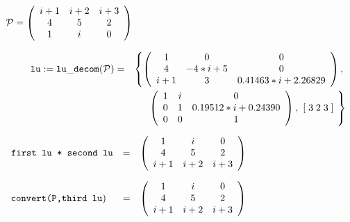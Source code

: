\vspace*{0.5in}

\begin{flushleft}
\hspace*{0.175in}
\begin{math}  
{\cal P} = \left( \begin{array}{ccc} i+1 & i+2 & i+3 \\ 4 & 5 & 2 \\ 1 
& i & 0
\end{array} \right)
\end{math}  
\end{flushleft}

\begin{eqnarray}
\hspace*{0.22in}
{\tt lu} := {\tt lu\_decom}({\cal P}) & = & 
\left\{ 
        \left( \begin{array}{ccc} 1 & 0 & 0 \\ 4 & -4*i+5 & 0 \\ i+1 & 
3 & 0.41463*i+2.26829 \end{array} \right), \right. \nonumber \\ & & 
\left. \: \; \,  \left( \begin{array}{ccc} 1 & i & 0 \\ 0 & 1 & 
0.19512*i+0.24390 \\ 0 & 0 & 1 \end{array} \right), \hspace*{0.05in} 
[\; 3 \; 2 \; 3 \;] \hspace*{0.05in}
\right\} \nonumber
\end{eqnarray}

\vspace*{0.1in}

\begin{flushleft}  
\hspace*{0.1in}
\begin{math}  
\begin{array}{ccc}
${\tt first lu * second lu}$ & = & 
        \left( \begin{array}{ccc} 1 & i & 0 \\ 4 & 5 & 2 \\ i+1 & i+2 &
i+3 
 \end{array} \right) 
\end{array}
\end{math}  
\end{flushleft}

\begin{flushleft}  
\hspace*{0.1in}
\begin{math}  
\begin{array}{ccc}
${\tt convert({\cal P},third lu}$) \hspace*{0.1in} & = & \left( 
\begin{array}{c c c} 1 & i & 0 \\ 4 & 5 & 2 \\ i+1 & i+2 & i+3 
 \end{array} \right) 
\end{array}
\end{math}  
\end{flushleft}

